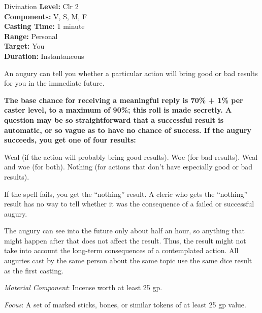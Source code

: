 {Divination}
{
	\textbf{Level:}
	Clr 2\\
	\textbf{Components:}
	V, S, M, F\\
	\textbf{Casting Time:}
	1 minute\\
	\textbf{Range:}
	Personal\\
	\textbf{Target:}
	You\\
	\textbf{Duration:}
	Instantaneous\\
}
{
	An augury can tell you whether a particular action will bring good or bad results for you in the immediate future.

	\textbf{	The base chance for receiving a meaningful reply is 70\% + 1\% per caster level, to a maximum of 90\%; this roll is made secretly. A question may be so straightforward that a successful result is automatic, or so vague as to have no chance of success. If the augury succeeds, you get one of four results:}


Weal (if the action will probably bring good results).
Woe (for bad results).
Weal and woe (for both).
Nothing (for actions that don't have especially good or bad results).

	If the spell fails, you get the ``nothing'' result. A cleric who gets the ``nothing'' result has no way to tell whether it was the consequence of a failed or successful augury.

	The augury can see into the future only about half an hour, so anything that might happen after that does not affect the result. Thus, the result might not take into account the long-term consequences of a contemplated action. All auguries cast by the same person about the same topic use the same dice result as the first casting.

	\textit{Material Component}:
	Incense worth at least 25 gp.

	\textit{Focus}:
	A set of marked sticks, bones, or similar tokens of at least 25 gp value.

}

